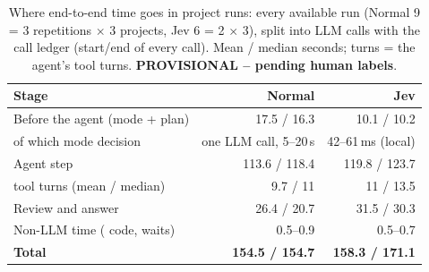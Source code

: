 \begin{table}[t]\centering\scriptsize
\caption{Where end-to-end time goes in project runs: every available run (Normal 9 = 3 repetitions $\times$ 3 projects, Jev 6 = 2 $\times$ 3), split into LLM calls with the call ledger (start/end of every call). Mean / median seconds; turns = the agent's tool turns. \textbf{PROVISIONAL -- pending human labels}.}
\label{tab:timing}
\begin{tabular}{l r r}\toprule
Stage & Normal & Jev\\\midrule
Before the agent (mode + plan) & 17.5 / 16.3 & 10.1 / 10.2\\
\quad of which mode decision & one LLM call, 5--20\,s & 42--61\,ms (local)\\
Agent step & 113.6 / 118.4 & 119.8 / 123.7\\
\quad tool turns (mean / median) & 9.7 / 11 & 11 / 13.5\\
Review and answer & 26.4 / 20.7 & 31.5 / 30.3\\
Non-LLM time (\sys{} code, waits) & 0.5--0.9 & 0.5--0.7\\\midrule
\textbf{Total} & \textbf{154.5 / 154.7} & \textbf{158.3 / 171.1}\\
\bottomrule\end{tabular}\end{table}

